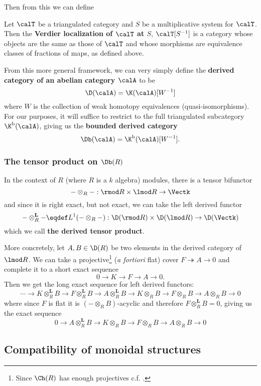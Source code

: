 \documentclass[12pt]{article}
\begin{document}
Then from this we can define
\begin{defn}
	Let $\calT$ be a triangulated category and $S$ be a multiplicative system for $\calT$. Then the \textbf{Verdier localization of $\calT$ at $S$}, 
	$\calT[S^{-1}]$ is a category whose objects are the same as those of $\calT$ and whose morphisms are equivalence classes of 
	fractions of maps, as defined above.
\end{defn}

From this more general framework, we can very simply define the \textbf{derived category of an abelian category $\calA$}
to be 
\[\D(\calA)=\K(\calA)[W^{-1}]\]
where $W$ is the collection of weak homotopy equivalences (quasi-isomorphisms). For our purposes, it will suffice 
to restrict to the full triangulated subcategory $\K^\text{b}(\calA)$, giving us the \textbf{bounded derived category}
\[\Db(\calA)=\K^\text{b}(\calA)[W^{-1}].\]

\subsubsection*{The tensor product on \texorpdfstring{$\Db(R)$}{Db(R)}}
In the context of $R$ (where $R$ is a $k$ algebra) modules, there is a tensor bifunctor 
\[-\otimes_R-:\rmod R\times\lmod R\to \Vectk\]
and since it is right exact, but not exact, we can take the left derived functor
\[-\otimes_R^\mathbf{L}-\eqdef L^1(-\otimes_R-):\D(\rmod R)\times\D(\lmod R)\to\D(\Vectk)\]
which we call \textbf{the derived tensor product}.

More concretely, let $A,B\in\D(R)$ be two elements in the derived category of $\lmod R$. We can take a projective\footnote{Since $\Ch(R)$ has enough projectives c.f. \cite[ex. 2.2.2]{weibel}.} (\textit{a fortiori} flat)
cover $F\twoheadrightarrow A\to 0$ and complete it to a short exact sequence 
\[0\to K\to F\to A\to 0.\]
Then we get the long exact sequence for left derived functors:
\[\cdots\to K\otimes_R^\mathbf{L}B\to F\otimes_R^\mathbf{L}B\to A\otimes_R^\mathbf{L}B\to K\otimes_RB\to F\otimes_R B\to A\otimes_R B\to 0\]
where since $F$ is flat it is $(-\otimes_RB)$-acyclic and therefore $F\otimes_R^\mathbf{L}B=0$, giving us the exact sequence 
\[0\to A\otimes_R^\mathbf{L}B\to K\otimes_RB\to F\otimes_R B\to A\otimes_R B\to 0\]

\subsection{Compatibility of monoidal structures}
\end{document}
